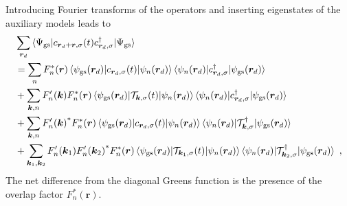 Introducing Fourier transforms of the operators and inserting eigenstates of the auxiliary models leads to
\begin{equation}\begin{aligned}\label{nonlocalGreens}
&\sum_{\bm r_d}\braket{\Psi_\text{gs} | c_{{\bm r_d + \bm r},\sigma}(t) c^\dagger_{{\bm r_d},\sigma} | \Psi_\text{gs}} \\
&= \sum_{n}F_n^*(\bm r)\braket{\psi_\text{gs}({\bm r_d}) |  c_{{\bm r_d},\sigma}(t) | \psi_{n}(\bm r_d)} \braket{\psi_{n}(\bm r_d) | c^\dagger_{{\bm r_d},\sigma} | \psi_\text{gs}({\bm r_d})}\\
																													  &+ \sum_{\bm k, n}F^\prime_n(\bm k)F_n^*(\bm r)\braket{\psi_\text{gs}({\bm r_d}) | \mathcal{T}_{\bm k,\sigma}(t) | \psi_{n}(\bm r_d)} \braket{\psi_{n}(\bm r_d) | c^\dagger_{{\bm r_d},\sigma} | \psi_\text{gs}({\bm r_d})}\\
																													  &+ \sum_{\bm k, n}{F^\prime_n(\bm k)}^*F_n^*(\bm r)\braket{\psi_\text{gs}({\bm r_d}) | c_{\bm r_d,\sigma}(t) | \psi_{n}(\bm r_d)} \braket{\psi_{n}(\bm r_d) | \mathcal{T}^\dagger_{\bm k,\sigma} | \psi_\text{gs}({\bm r_d})}\\
																													  &+\sum_{\bm k_1,\bm k_2}F^\prime_n(\bm k_1){F^\prime_n(\bm k_2)}^*F_n^*(\bm r)\braket{\psi_\text{gs}({\bm r_d}) | \mathcal{T}_{\bm k_1,\sigma}(t) | \psi_{n}(\bm r_d)} \braket{\psi_{n}(\bm r_d) | \mathcal{T}^\dagger_{\bm k_2,\sigma} | \psi_\text{gs}({\bm r_d})}~,
\end{aligned}\end{equation}
The net difference from the diagonal Greens function is the presence of the overlap factor \(F_n^*(\bm r)\).

